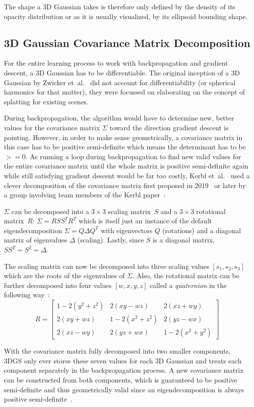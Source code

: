 The shape a 3D Gaussian takes is therefore only defined by the density of its opacity distribution or as it is usually visualized, by its ellipsoid bounding shape.

\subsection{3D Gaussian Covariance Matrix Decomposition}
\label{ch:matrix_decomp}
For the entire learning process to work with backpropagation and gradient descent, a 3D Gaussian has to be differentiable. The original inception of a 3D Gaussian by Zwicker et~al.~\cite{zwickerSurfaceSplatting2001} did not account for differentiability (or spherical harmonics for that matter), they were focussed on elaborating on the concept of splatting for existing scenes.

During backpropagation, the algorithm would have to determine new, better values for
\newpage
\hspace{-5.2mm}
the covariance matrix $\Sigma$ toward the direction gradient descent is pointing. However, in order to make sense geometrically, a covariance matrix in this case has to be positive semi-definite which means the determinant has to be $>=0$. 
As running a loop during backpropagation to find new valid values for the entire covariance matrix until the whole matrix is positive semi-definite again while still satisfying gradient descent would be far too costly, Kerbl et~al.~\cite{kerbl3DGaussianSplatting2023} used a clever decomposition of the covariance matrix first proposed in 2019~\cite{yifanDifferentiableSurfaceSplatting2019} or later by a group involving team members of the Kerbl paper~\cite{kopanasPointBasedNeuralRendering2021}:

$\Sigma$ can be decomposed into a $3\times 3$ scaling matrix~$S$ and a $3\times 3$ rotational matrix~$R$: $\Sigma = RSS^TR^T$ which is itself just an instance of the default eigendecomposition $\Sigma = Q\Delta Q^T$ with eigenvectors $Q$ (rotations) and a diagonal matrix of eigenvalues $\Delta$ (scaling). Lastly, since $S$ is a diagonal matrix, $SS^T=S^2=\Delta$.

The scaling matrix can now be decomposed into three scaling values $[s_1, s_2, s_3]$ which are the roots of the eigenvalues of $\Sigma$. Also, the rotational matrix can be further decomposed into four values $[w, x, y, z]$ called a \textit{quaternion} in the following way~\cite{Shoemake1985AnimatingRW}:
$$
R =
\begin{bmatrix} 
    1 - 2(y^2 + z^2) & 2(xy - wz) & 2(xz + wy) \\
    2(xy + wz) & 1 - 2(x^2 + z^2) & 2(yz - wx) \\ 
    2(xz - wy) & 2(yz + wx) & 1 - 2(x^2 + y^2) 
\end{bmatrix}
$$

With the covariance matrix fully decomposed into two smaller components, 3DGS only ever stores these seven values for each 3D Gaussian and treats each component separately in the backpropagation process. A new covariance matrix can be constructed from both components, which is guaranteed to be positive semi-definite and thus geometrically valid since an eigendecomposition is always positive semi-definite~\cite{riedel2025mathematische}.
